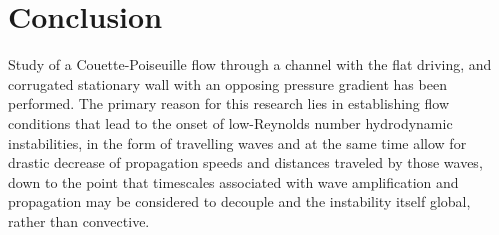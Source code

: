 \documentclass[lineno]{jfm}
\begin{document}



\section{Conclusion} \label{sec:conclusion}
Study of a Couette-Poiseuille flow through a channel with the flat driving, and corrugated stationary wall with an opposing pressure gradient has been performed.
The primary reason for this research lies in establishing flow conditions that lead to the onset of low-Reynolds number hydrodynamic instabilities, in the form of travelling waves and at the same time allow for drastic decrease of propagation speeds and distances traveled by those waves, down to the point that timescales associated with wave amplification and propagation may be considered to decouple and the instability itself global, rather than convective.
\end{document}
